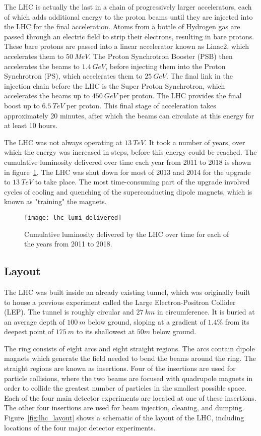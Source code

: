 The LHC is actually the last in a chain of progressively larger accelerators,
each of which adds additional energy to the proton beams until they are injected into the LHC for the final acceleration.
Atoms from a bottle of Hydrogen gas are passed through an electric field to strip their electrons,
resulting in bare protons.
These bare protons are passed into a linear accelerator known as Linac2, which accelerates them to $50~MeV$.
The Proton Synchrotron Booster (PSB) then accelerates the beams to $1.4~GeV$,
before injecting them into the Proton Synchrotron (PS), which accelerates them to $25~GeV$.
The final link in the injection chain before the LHC is the Super Proton Synchrotron,
which accelerates the beams up to $450~GeV$ per proton.
The LHC provides the final boost up to $6.5~TeV$ per proton.
This final stage of acceleration takes approximately 20 minutes, after which the beams can circulate at this energy for at least 10 hours.

The LHC was not always operating at $13~TeV$.
It took a number of years, over which the energy was increased in steps, before this energy could be reached.
The cumulative luminosity delivered over time each year from 2011 to 2018 is shown in figure~\ref{fig:lhc_lumi_delivered}.
The LHC was shut down for most of 2013 and 2014 for the upgrade to $13~TeV$ to take place.
The most time-consuming part of the upgrade involved cycles of cooling and quenching of the superconducting dipole magnets,
which is known as "training" the magnets.

\begin{figure}[h]
\texttt{[image: lhc\_lumi\_delivered]}
\caption{Cumulative luminosity delivered by the LHC over time for each of the years from 2011 to 2018.}
\label{fig:lhc_lumi_delivered}
\end{figure}

\subsection{Layout}\label{subsec:lhc_layout}

The LHC was built inside an already existing tunnel,
which was originally built to house a previous experiment called the Large Electron-Positron Collider (LEP).
The tunnel is roughly circular and $27~km$ in circumference.
It is buried at an average depth of $100~m$ below ground, sloping at a gradient of $1.4\%$ from its deepest point
of $175~m$ to its shallowest at $50m$ below ground.

The ring consists of eight arcs and eight straight regions.
The arcs contain dipole magnets which generate the field needed to bend the beams around the ring.
The straight regions are known as insertions.
Four of the insertions are used for particle collisions,
where the two beams are focused with quadrupole magnets in order to collide the greatest number of particles in the smallest possible space.
Each of the four main detector experiments are located at one of these insertions.
The other four insertions are used for beam injection, cleaning, and dumping.
Figure~\ref{fig:lhc_layout} shows a schematic of the layout of the LHC, including locations of the four major detector experiments.

